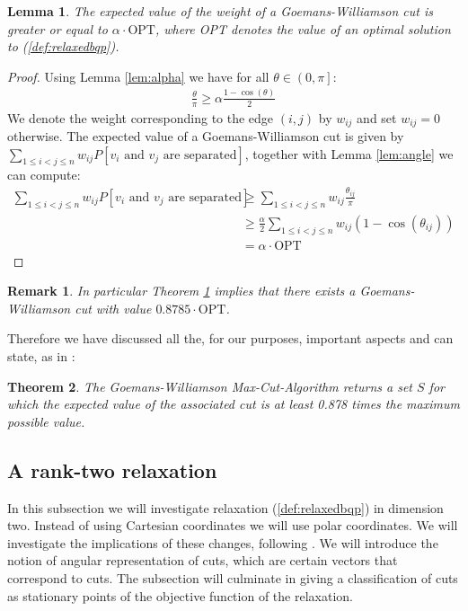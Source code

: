 \documentclass[12pt,a4paper]{article}
\theoremstyle{mythm}
\newtheorem{thm}{Theorem}[section]
\newtheorem{lem}[thm]{Lemma}
\newtheorem*{rem}{Remark}
\begin{document}
\begin{lem}
\label{lem:GWalgo} 
The expected value of the weight of a Goemans-Williamson cut is greater or equal to $ \alpha \cdot \text{OPT}  $, where OPT denotes the value of an optimal solution to
(\ref{def:relaxedbqp}).
\end{lem} 
\begin{proof}
Using Lemma \ref{lem:alpha} we have for all $ \theta \in \left( 0, \pi  \right]   $:
\begin{align*}
\frac{ \theta }{ \pi  } \geq \alpha \frac{ 1 - \cos( \theta )  }{ 2 }  
\end{align*} 
We denote the weight corresponding to the edge $ \left( i,j \right)  $ by $ w _{ ij }  $ and set $ w _{ ij } = 0 $ otherwise.
The expected value of a Goemans-Williamson cut is given by \\ $ \sum_{ 1 \leq i < j \leq n    }^{  } w _{ ij }  P \left[ v_i \text{ and } v_j \text{ are separated}  \right]
$, together with Lemma \ref{lem:angle} we can compute:
\begin{align*}
 \sum_{ 1 \leq i < j \leq n    }^{  } w _{ ij }  P \left[ v_i \text{ and } v_j \text{ are separated}  \right]
& \geq \sum_{ 1 \leq i < j \leq n    }^{  } w _{ ij }  \frac{ \theta _{ ij }  }{ \pi } \\
&\geq \frac{ \alpha }{ 2 }  \sum_{ 1 \leq i < j \leq n    }^{  } w _{ ij }  \left( 1 - \cos( \theta _{ ij }  )  \right)  \\
&= \alpha \cdot \text{OPT} 
\end{align*} 
\end{proof}
\begin{rem}
In particular Theorem \ref{lem:GWalgo} implies that there exists a Goemans-Williamson cut with value $ 0.8785 \cdot \text{OPT} $.
\end{rem} 

Therefore we have discussed all the, for our purposes, important aspects and can state, as in \cite[Theorem 16.12]{Korte2018}:
\begin{thm}
The Goemans-Williamson  Max-Cut-Algorithm returns a set $ S $ for which the expected value of 
the associated cut is at least 0.878 times the maximum possible value.
\end{thm} 

\subsection{A rank-two relaxation} 
\label{sec:rankTworelaxation} 
In this subsection we will investigate relaxation (\ref{def:relaxedbqp}) in dimension two.
Instead of using Cartesian coordinates we will use polar coordinates.
We will investigate the implications of these changes, following \cite[Sec. 3]{Burer2002}.
We will introduce the notion of angular representation of cuts, which are certain vectors that correspond to cuts.
The subsection will culminate in giving a classification of cuts as stationary points of the objective function of the relaxation.
\end{document}
